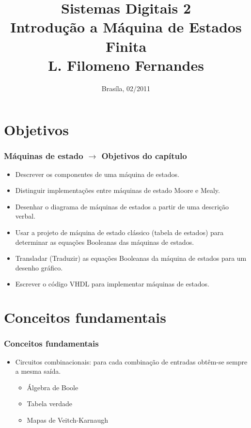 \documentclass{beamer}
\title{Sistemas Digitais 2\\ \textbf{Introdução a Máquina de Estados Finita} \\ \textbf{L. Filomeno  Fernandes}}
\date{Brasíla, 02/2011}
\institute{\textbf{Universidade de Brasília - Faculdade do Gama}}
\begin{document}
\begin{frame}
  \titlepage
\end{frame}

\section{Objetivos}
\begin{frame}
  \frametitle{Máquinas de estado $\xrightarrow{}$ Objetivos do capítulo}
  \begin{itemize}
   \item Descrever os componentes de uma máquina de estados.
   \item Distinguir implementações entre máquinas de estado Moore e Mealy.
   \item Desenhar o diagrama de máquinas de estados a partir de uma descrição verbal.
   \item Usar a projeto de máquina de estado clássico (tabela de estados) para determinar as equações Booleanas das máquinas de estados.
   \item Transladar (Traduzir) as equações Booleanas da máquina de estados para um desenho gráfico.
   \item Escrever o código VHDL para implementar máquinas de estados.
  \end{itemize}
\end{frame}

\section{Conceitos fundamentais}
\begin{frame}
 \frametitle{Conceitos fundamentais}
  \begin{itemize}
   \item Circuitos combinacionais: para cada combinação de entradas obtêm-se sempre a mesma saída.
   \begin{itemize}
    \item Álgebra de Boole 
    \item Tabela verdade
    \item Mapas de Veitch-Karnaugh
   \end{itemize}
  \end{itemize}
\end{frame}
\end{document}
